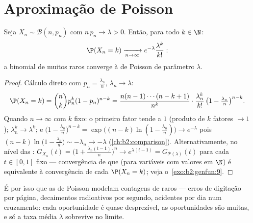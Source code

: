 \section{Aproximação de Poisson}

\begin{theorem}\label{thm:b2:genfun:rareevents}
Seja $X_n \sim \mathcal{B}(n, p_n)$ com $n\,p_n \to \lambda > 0$.
Então, para todo $k \in \N$:
\[
\P(X_n = k)
\xrightarrow[n\to\infty]{}
e^{-\lambda}\frac{\lambda^k}{k!} :
\]
a  binomial de muitos  raros converge à
 de Poisson de parâmetro $\lambda$.
\end{theorem}

\begin{proof}
Cálculo direto com $p_n = \frac{\lambda_n}{n}$, $\lambda_n
\to \lambda$:
\[
\P(X_n = k)
= \binom nk p_n^k(1 - p_n)^{n-k}
= \frac{n(n-1)\cdots(n-k+1)}{n^k}\cdot
\frac{\lambda_n^k}{k!}\,
\bigl(1 - \tfrac{\lambda_n}{n}\bigr)^{n-k} .
\]
Quando $n \to \infty$ com $k$ fixo: o primeiro fator tende a $1$
(produto de $k$ fatores $\to 1$); $\lambda_n^k \to \lambda^k$;
e $\bigl(1 - \frac{\lambda_n}{n}\bigr)^{n-k} =
\exp\bigl((n-k)\ln(1 - \frac{\lambda_n}{n})\bigr) \to
e^{-\lambda}$ pois $(n - k)\ln\bigl(1 - \frac{\lambda_n}{n}\bigr)
\sim -\lambda_n \to -\lambda$
(\cref{ch:b2:comparison}). Alternativamente, no nível das
: $G_{X_n}(t) = \bigl(1 +
\frac{\lambda_n(t-1)}{n}\bigr)^n \to e^{\lambda(t - 1)} =
G_{\mathcal{P}(\lambda)}(t)$ para cada $t \in [0, 1]$ fixo ---
convergência de  que (para variáveis com valores em $\N$)
é equivalente à convergência de cada $\P(X_n = k)$;
veja o~\cref{exo:b2:genfun:9}.
\end{proof}

\begin{remark}
É por isso que as  de Poisson modelam contagens de  raros --- erros de digitação por
página, decaimentos radioativos por segundo, acidentes por dia num
cruzamento: cada oportunidade é quase desprezível, as oportunidades são
muitas, e só a taxa média $\lambda$ sobrevive no limite.
\end{remark}

